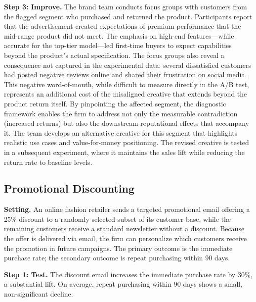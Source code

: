 \documentclass[11pt,letterpaper,english]{article}
\theoremstyle{definition}
\theoremstyle{definition}
\begin{document}
\begin{bibunit}
\vspace{4pt}
\noindent
\textbf{Step 3: Improve.}
The brand team conducts focus groups with customers from the flagged segment who purchased and returned the product. Participants report that the advertisement created expectations of premium performance that the mid-range product did not meet. The emphasis on high-end features---while accurate for the top-tier model---led first-time buyers to expect capabilities beyond the product's actual specification. The focus groups also reveal a consequence not captured in the experimental data: several dissatisfied customers had posted negative reviews online and shared their frustration on social media. This negative word-of-mouth, while difficult to measure directly in the A/B test, represents an additional cost of the misaligned creative that extends beyond the product return itself. By pinpointing the affected segment, the diagnostic framework enables the firm to address not only the measurable contradiction (increased returns) but also the downstream reputational effects that accompany it. The team develops an alternative creative for this segment that highlights realistic use cases and value-for-money positioning. The revised creative is tested in a subsequent experiment, where it maintains the sales lift while reducing the return rate to baseline levels.

\subsection{Promotional Discounting}
\label{sec:app-discount}

\noindent
\textbf{Setting.} An online fashion retailer sends a targeted promotional email offering a 25\% discount to a randomly selected subset of its customer base, while the remaining customers receive a standard newsletter without a discount. Because the offer is delivered via email, the firm can personalize which customers receive the promotion in future campaigns. The primary outcome is the immediate purchase rate; the secondary outcome is repeat purchasing within 90 days.

\vspace{4pt}
\noindent
\textbf{Step 1: Test.}
The discount email increases the immediate purchase rate by 30\%, a substantial lift. On average, repeat purchasing within 90 days shows a small, non-significant decline.


\end{bibunit}
\end{document}
